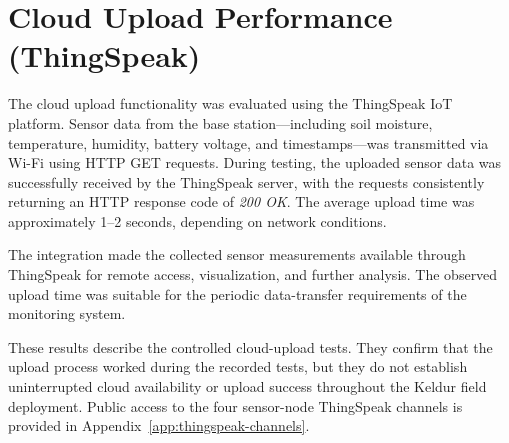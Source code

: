 \section{Cloud Upload Performance
(ThingSpeak)}

The cloud upload functionality was evaluated using the ThingSpeak IoT
platform. Sensor data from the base station---including soil moisture,
temperature, humidity, battery voltage, and timestamps---was transmitted
via Wi-Fi using HTTP GET requests. During testing, the uploaded sensor
data was successfully received by the ThingSpeak server, with the
requests consistently returning an HTTP response code of \emph{200 OK}.
The average upload time was approximately 1--2 seconds, depending on
network conditions.

The integration made the collected sensor measurements available through ThingSpeak for remote access, visualization, and further analysis. The observed upload time was suitable for the periodic data-transfer requirements of the monitoring system.

These results describe the controlled cloud-upload tests. They confirm that the upload process worked during the recorded tests, but they do not establish uninterrupted cloud availability or upload success throughout the Keldur field deployment. Public access to the four sensor-node ThingSpeak channels is provided in Appendix~\ref{app:thingspeak-channels}.
